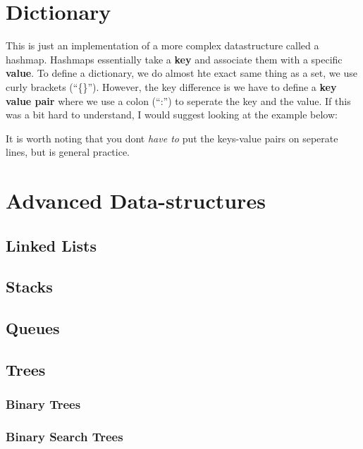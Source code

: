 \documentclass[12pt,a4paper]{book}
\begin{document}
			


		\section{Dictionary}
			This is just an implementation of a more complex datastructure called a hashmap. Hashmaps essentially take a \textbf{key} and associate them with a specific \textbf{value}. To define a dictionary, we do almost hte exact same thing as a set, we use curly brackets (``\{\}''). However, the key difference is we have to define a \textbf{key value pair} where we use a colon (``:'') to seperate the key and the value. If this was a bit hard to understand, I would suggest looking at the example below:
			
			

			It is worth noting that you dont \textit{have to} put the keys-value pairs on seperate lines, but is general practice.
			
		\section{Advanced Data-structures}
			\subsection{Linked Lists}

			\subsection{Stacks}

			\subsection{Queues}

			\subsection{Trees}
				\subsubsection{Binary Trees}

				\subsubsection{Binary Search Trees}
\end{document}
